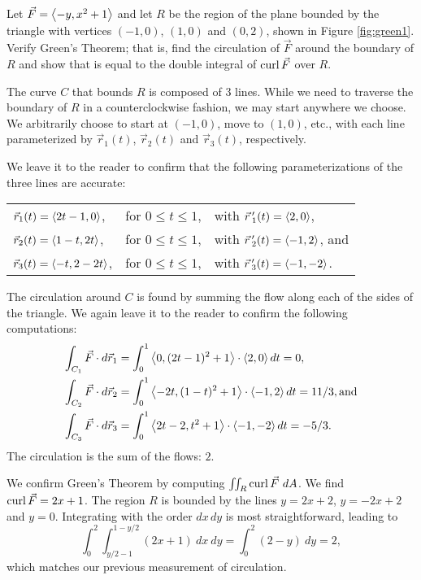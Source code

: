 {Let $\vec F =\left\langle -y,x^2+1\right\rangle$ and let $R$ be the region of the plane bounded by the triangle with vertices $(-1,0)$, $(1,0)$ and $(0,2)$, shown in Figure \ref{fig:green1}. Verify Green's Theorem; that is, find the circulation of $\vec F$ around the boundary of $R$ and show that is equal to the double integral of $\operatorname{curl} \vec F$ over $R$.
}
{The curve $C$ that bounds $R$ is composed of 3 lines. While we need to traverse the boundary of $R$ in a counterclockwise fashion, we may start anywhere we choose. We arbitrarily choose to start at $(-1,0)$, move to $(1,0)$, etc., with each line parameterized by $\vec r_1(t)$, $\vec r_2(t)$ and $\vec r_3(t)$, respectively.

We leave it to the reader to confirm that the following parameterizations of the three lines are accurate:

\begin{tabular}{lll}
$\vec r_1(t) = \left\langle 2t-1,0\right\rangle$,& for $0\leq t\leq 1$,& with $\vec r\, '_1(t) = \left\langle 2,0\right\rangle$,\\
$\vec r_2(t) = \left\langle 1-t,2t\right\rangle$,& for $0\leq t\leq 1$,& with $\vec r\, '_2(t) = \left\langle -1,2\right\rangle$, and\\
$\vec r_3(t) = \left\langle -t,2-2t\right\rangle$,& for $0\leq t\leq 1$,& with $\vec r\, '_3(t) = \left\langle -1,-2\right\rangle$.
\end{tabular}

The circulation around $C$ is found by summing the flow along each of the sides of the triangle. We again leave it to the reader to confirm the following computations:
\begin{align*}
\int_{C_1}\vec F\cdot d\vec r_1 &= \int_0^1 \left\langle 0,(2t-1)^2+1\right\rangle\cdot \left\langle 2,0\right\rangle dt = 0,\\
\int_{C_2}\vec F\cdot d\vec r_2 &= \int_0^1 \left\langle -2t,(1-t)^2+1\right\rangle\cdot \left\langle -1,2\right\rangle dt = 11/3, \text{and}\\
\int_{C_3}\vec F\cdot d\vec r_3 &= \int_0^1 \left\langle 2t-2,t^2+1\right\rangle\cdot \left\langle -1,-2\right\rangle dt = -5/3.
\end{align*}
The circulation is the sum of the flows: $2$.

We confirm Green's Theorem by computing $\iint_R \operatorname{curl} \vec F\ dA$. We find $\operatorname{curl} \vec F = 2x+1$. The region $R$ is bounded by the lines $y = 2x+2$, $y=-2x+2$ and $y=0$. Integrating with the order $dx\, dy$ is most straightforward, leading to
$$\int_0^2\int_{y/2-1}^{1-y/2} (2x+1)\ dx\ dy = \int_0^2 (2-y)\ dy = 2,$$
which matches our previous measurement of circulation. 
}\\

